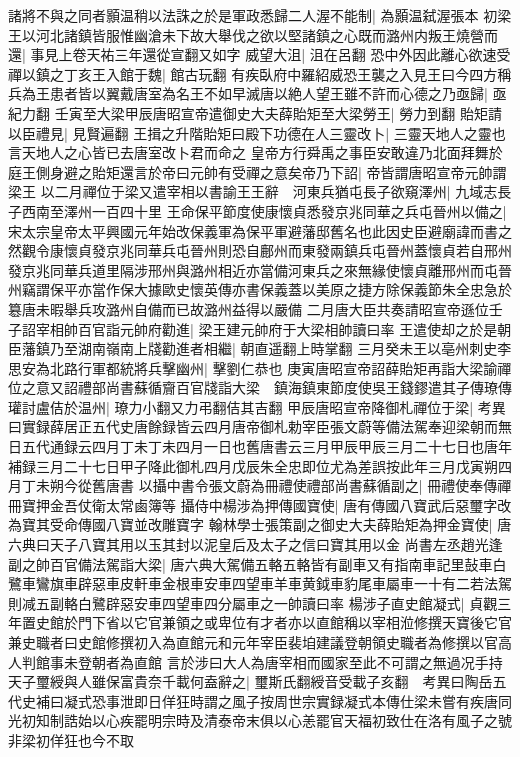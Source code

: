 諸將不與之同者顥温稍以法誅之於是軍政悉歸二人渥不能制|{
	為顥温弑渥張本}
初梁王以河北諸鎮皆服惟幽滄未下故大舉伐之欲以堅諸鎮之心既而潞州内叛王燒營而還|{
	事見上卷天祐三年還從宣翻又如字}
威望大沮|{
	沮在呂翻}
恐中外因此離心欲速受禪以鎮之丁亥王入館于魏|{
	館古玩翻}
有疾臥府中羅紹威恐王襲之入見王曰今四方稱兵為王患者皆以翼戴唐室為名王不如早滅唐以絶人望王雖不許而心德之乃亟歸|{
	亟紀力翻}
壬寅至大梁甲辰唐昭宣帝遣御史大夫薛貽矩至大梁勞王|{
	勞力到翻}
貽矩請以臣禮見|{
	見賢遍翻}
王揖之升階貽矩曰殿下功德在人三靈改卜|{
	三靈天地人之靈也言天地人之心皆已去唐室改卜君而命之}
皇帝方行舜禹之事臣安敢違乃北面拜舞於庭王側身避之貽矩還言於帝曰元帥有受禪之意矣帝乃下詔|{
	帝皆謂唐昭宣帝元帥謂梁王}
以二月禪位于梁又遣宰相以書諭王王辭　河東兵猶屯長子欲窺澤州|{
	九域志長子西南至澤州一百四十里}
王命保平節度使康懷貞悉發京兆同華之兵屯晉州以備之|{
	宋太宗皇帝太平興國元年始改保義軍為保平軍避藩邸舊名也此因史臣避廟諱而書之然觀令康懷貞發京兆同華兵屯晉州則恐自鄜州而東發兩鎮兵屯晉州蓋懷貞若自邢州發京兆同華兵道里隔涉邢州與潞州相近亦當備河東兵之來無緣使懷貞離邢州而屯晉州竊謂保平亦當作保大據歐史懷英傳亦書保義蓋以美原之捷方除保義節朱全忠急於簒唐未暇舉兵攻潞州自備而已故潞州益得以嚴備}
二月唐大臣共奏請昭宣帝遜位壬子詔宰相帥百官詣元帥府勸進|{
	梁王建元帥府于大梁相帥讀曰率}
王遣使却之於是朝臣藩鎮乃至湖南嶺南上牋勸進者相繼|{
	朝直遥翻上時掌翻}
三月癸未王以亳州刺史李思安為北路行軍都統將兵擊幽州|{
	擊劉仁恭也}
庚寅唐昭宣帝詔薛貽矩再詣大梁諭禪位之意又詔禮部尚書蘇循齎百官牋詣大梁　鎮海鎮東節度使吳王錢鏐遣其子傳璙傳瓘討盧佶於温州|{
	璙力小翻又力弔翻佶其吉翻}
甲辰唐昭宣帝降御札禪位于梁|{
	考異曰實録薛居正五代史唐餘録皆云四月唐帝御札勅宰臣張文蔚等備法駕奉迎梁朝而無日五代通録云四月丁未丁未四月一日也舊唐書云三月甲辰甲辰三月二十七日也唐年補録三月二十七日甲子降此御札四月戊辰朱全忠即位尤為差誤按此年三月戊寅朔四月丁未朔今從舊唐書}
以攝中書令張文蔚為冊禮使禮部尚書蘇循副之|{
	冊禮使奉傳禪冊寶押金吾仗衛太常鹵簿等}
攝侍中楊涉為押傳國寶使|{
	唐有傳國八寶武后惡璽字改為寶其受命傳國八寶並改雕寶字}
翰林學士張策副之御史大夫薛貽矩為押金寶使|{
	唐六典曰天子八寶其用以玉其封以泥皇后及太子之信曰寶其用以金}
尚書左丞趙光逢副之帥百官備法駕詣大梁|{
	唐六典大駕備五輅五輅皆有副車又有指南車記里鼔車白鷺車鸞旗車辟惡車皮軒車金根車安車四望車羊車黄鉞車豹尾車屬車一十有二若法駕則减五副輅白鷺辟惡安車四望車四分屬車之一帥讀曰率}
楊涉子直史館凝式|{
	貞觀三年置史館於門下省以它官兼領之或卑位有才者亦以直館稱以宰相涖修撰天寶後它官兼史職者曰史館修撰初入為直館元和元年宰臣裴垍建議登朝領史職者為修撰以官高人判館事未登朝者為直館}
言於涉曰大人為唐宰相而國家至此不可謂之無過况手持天子璽綬與人雖保富貴奈千載何盍辭之|{
	璽斯氏翻綬音受載子亥翻　考異曰陶岳五代史補曰凝式恐事泄即日佯狂時謂之風子按周世宗實録凝式本傳仕梁未嘗有疾唐同光初知制誥始以心疾罷明宗時及清泰帝末俱以心恙罷官天福初致仕在洛有風子之號非梁初佯狂也今不取}
